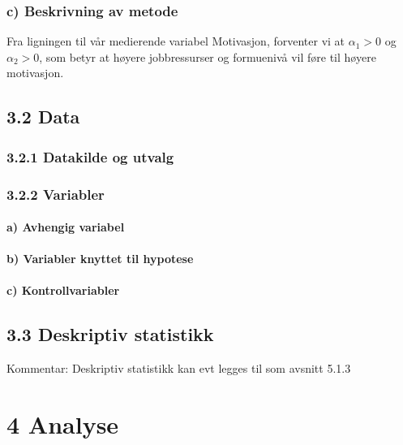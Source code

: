 \documentclass[
  12pt,
  a4paper,
  DIV=11,
  numbers=noendperiod]{scrartcl}
\let\oldparagraph\paragraph
\renewcommand{\paragraph}[1]{\oldparagraph{#1}\mbox{}}
\begin{document}
\subsubsection{c) Beskrivning av metode}\label{c-beskrivning-av-metode}

Fra ligningen til vår medierende variabel Motivasjon, forventer vi at
\(\alpha_1 > 0\) og \(\alpha_2 > 0\), som betyr at høyere jobbressurser
og formuenivå vil føre til høyere motivasjon.

\subsection{3.2 Data}\label{data}

\subsubsection{3.2.1 Datakilde og utvalg}\label{datakilde-og-utvalg}

\subsubsection{3.2.2 Variabler}\label{variabler}

\paragraph{a) Avhengig variabel}\label{a-avhengig-variabel}

\paragraph{b) Variabler knyttet til
hypotese}\label{b-variabler-knyttet-til-hypotese}

\paragraph{c) Kontrollvariabler}\label{c-kontrollvariabler}

\subsection{3.3 Deskriptiv statistikk}\label{deskriptiv-statistikk}

Kommentar: Deskriptiv statistikk kan evt legges til som avsnitt 5.1.3

\newpage

\section{4 Analyse}\label{analyse}
\end{document}
